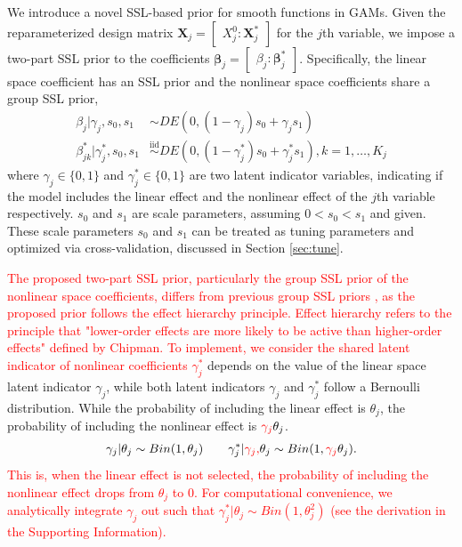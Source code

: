 \documentclass[AMA,STIX1COL,]{WileyNJD-v2}
\begin{document}
We introduce a novel SSL-based prior for smooth functions in GAMs. Given
the reparameterized design matrix
\(\boldsymbol{X}_j = \begin{bmatrix} X^0_j : \boldsymbol{X}_j^*\end{bmatrix}\)
for the \(j\)th variable, we impose a two-part SSL prior to the
coefficients
\(\boldsymbol{\beta}_j = \begin{bmatrix} \beta_j : \boldsymbol{\beta}_j^*\end{bmatrix}\).
Specifically, the linear space coefficient has an SSL prior and the
nonlinear space coefficients share a group SSL prior,
\begin{align}\label{eq:bham_ssl}
  \beta_{j} | \gamma_{j},s_0,s_1 &\sim DE(0,(1-\gamma_{j}) s_0 + \gamma_{j} s_1) \nonumber \\
  \beta^*_{jk} | \gamma^*_{j},s_0,s_1 &\overset{\text{iid}}{\sim}DE(0,(1-\gamma^*_{j}) s_0 + \gamma^*_{j} s_1), k=1,\dots, K_j
\end{align} where \(\gamma_{j}\in\{0,1\}\) and
\(\gamma^*_{j}\in \{0,1\}\) are two latent indicator variables,
indicating if the model includes the linear effect and the nonlinear
effect of the \(j\)th variable respectively. \(s_0\) and \(s_1\) are
scale parameters, assuming \(0 < s_0 < s_1\) and given. These scale
parameters \(s_0\) and \(s_1\) can be treated as tuning parameters and
optimized via cross-validation, discussed in Section \ref{sec:tune}.

\textcolor{red}{The proposed two-part SSL prior, particularly the group SSL prior of the nonlinear space coefficients, differs from previous group SSL priors \cite{Tang2018, Tang2019}, as the proposed prior follows the effect hierarchy principle. Effect hierarchy refers to the principle that "lower-order effects are more likely to be active than higher-order effects" defined by Chipman\cite{chipman2006prior}. To implement, we consider the shared latent indicator of nonlinear coefficients $\gamma^*_j$}
depends on the value of the linear space latent indicator \(\gamma_j\),
while both latent indicators \(\gamma_j\) and \(\gamma^*_j\) follow a
Bernoulli distribution. While the probability of including the linear
effect is \(\theta_j\), the probability of including the nonlinear
effect is \(\textcolor{red}{\gamma_{j}}\theta_j\). \[
\begin{aligned}
&\gamma_{j} | \theta_j \sim Bin(1, \theta_j) & & 
&\gamma_{j}^*| \textcolor{red}{\gamma_{j}, } \theta_j \sim Bin(1, \textcolor{red}{\gamma_{j}}\theta_j).
\end{aligned}
\]
\textcolor{red}{This is, when the linear effect is not selected, the probability of including the nonlinear effect drops from $\theta_j$ to 0. For computational convenience, we analytically integrate $\gamma_j$ out such that $\gamma_{j}^*| \theta_j \sim Bin(1, \theta_j^2)$ (see the derivation in the Supporting Information).
}
\end{document}
